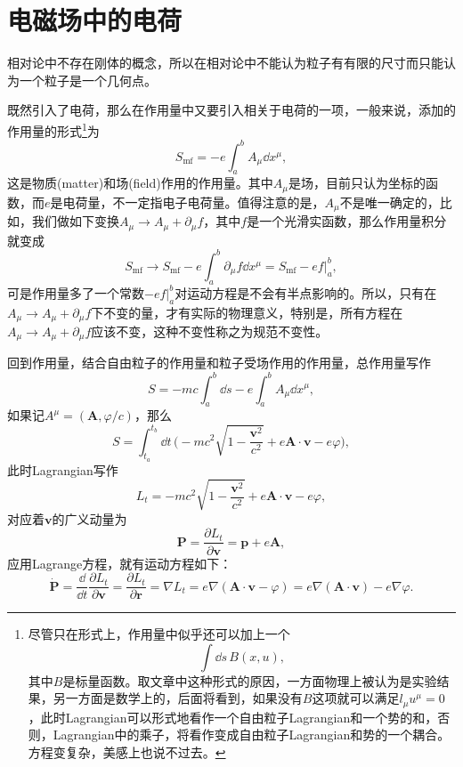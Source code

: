 \documentclass[10pt]{book}
\begin{document}


\section{电磁场中的电荷}
相对论中不存在刚体的概念，所以在相对论中不能认为粒子有有限的尺寸而只能认为一个粒子是一个几何点。

既然引入了电荷，那么在作用量中又要引入相关于电荷的一项，一般来说，添加的作用量的形式\footnote{尽管只在形式上，作用量中似乎还可以加上一个\[\int \dd s\, B(x,u),\]其中$B$是标量函数。取文章中这种形式的原因，一方面物理上被认为是实验结果，另一方面是数学上的，后面将看到，如果没有$B$这项就可以满足$l_\mu u^\mu=0$，此时Lagrangian可以形式地看作一个自由粒子Lagrangian和一个势的和，否则，Lagrangian中的乘子，将看作变成自由粒子Lagrangian和势的一个耦合。方程变复杂，美感上也说不过去。}为
\[
	S_{\mathrm{mf}}=-e\int_a^b A_\mu\dd x^\mu,
\]
这是物质(matter)和场(field)作用的作用量。其中$A_\mu$是场，目前只认为坐标的函数，而$e$是电荷量，不一定指电子电荷量。值得注意的是，$A_\mu$不是唯一确定的，比如，我们做如下变换$A_\mu\to A_\mu+\partial_\mu f$，其中$f$是一个光滑实函数，那么作用量积分就变成
\[
	S_{\mathrm{mf}}\to S_{\mathrm{mf}}-e\int_a^b \partial_\mu f \dd x^\mu=S_{\mathrm{mf}}-ef|_a^b,
\]
可是作用量多了一个常数$-ef|_a^b$对运动方程是不会有半点影响的。所以，只有在$A_\mu\to A_\mu+\partial_\mu f$下不变的量，才有实际的物理意义，特别是，所有方程在$A_\mu\to A_\mu+\partial_\mu f$应该不变，这种不变性称之为规范不变性。

回到作用量，结合自由粒子的作用量和粒子受场作用的作用量，总作用量写作
\[
	S=-mc\int_a^b \dd s-e\int_a^b A_\mu\dd x^\mu,
\]
如果记$A^\mu=(\bm{A},\varphi/c)$，那么
\[
	S=\int_{t_a}^{t_b} \dd t\,\biggl(-mc^2\sqrt{1-\frac{\bm{v}^2}{c^2}}+e \bm{A}\cdot\bm{v}-e\varphi\biggr),
\]
此时Lagrangian写作
\[
	L_t=-mc^2\sqrt{1-\frac{\bm{v}^2}{c^2}}+e \bm{A}\cdot\bm{v}-e\varphi,
\]
对应着$\bm{v}$的广义动量为
\[
	\bm{P}=\frac{\partial L_t}{\partial \bm{v}}=\bm{p}+e \bm{A},
\]
应用Lagrange方程，就有运动方程如下：
\[
	\dot{\bm{P}}=\frac{\dd}{\dd t}\frac{\partial L_t}{\partial \bm{v}}=\frac{\partial L_t}{\partial \bm{r}}=\nabla L_t=e\nabla(\bm{A}\cdot\bm{v}-\varphi)=e\nabla(\bm{A}\cdot\bm{v})-e\nabla\varphi.
\]
\end{document}
